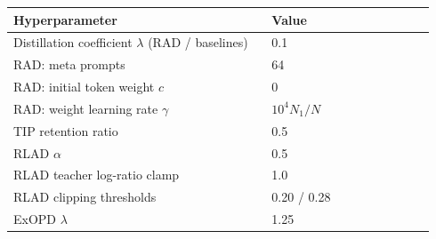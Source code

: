 \begin{minipage}[t]{0.49\linewidth}
\label{tab:method-hparams}
\centering
\normalsize
\setlength{\tabcolsep}{4pt}
\renewcommand{\arraystretch}{1.0}
\begin{tabular}{@{}C{0.58\linewidth}C{0.36\linewidth}@{}}
\toprule
Hyperparameter & Value \\
\midrule
Distillation coefficient \(\lambda\) (RAD / baselines) & 0.1 \\
RAD: meta prompts & 64 \\
RAD: initial token weight \(c\) & 0 \\
RAD: weight learning rate \(\gamma\) & \(10^4 N_1/N\) \\
TIP retention ratio & 0.5 \\
RLAD \(\alpha\) & 0.5 \\
RLAD teacher log-ratio clamp & 1.0 \\
RLAD clipping thresholds & 0.20 / 0.28 \\
ExOPD \(\lambda\) & 1.25 \\
\bottomrule
\end{tabular}
\end{minipage}
